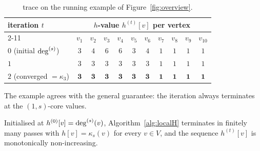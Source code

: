 \begin{table}[t]
\centering
\caption{\spin{} trace on the running example of Figure~\ref{fig:overview}.}
\label{tab:spinex}
\tiny
\setlength{\tabcolsep}{4pt}
\begin{tabular}{l|cccccccccc}
\toprule
\multirow{2}{*}{iteration $t$} & \multicolumn{10}{c}{$h$-value $h^{(t)}[v]$ per vertex} \\
\cmidrule(lr){2-11}
                                 & $v_1$ & $v_2$ & $v_3$ & $v_4$ & $v_5$ & $v_6$ & $v_7$ & $v_8$ & $v_9$ & $v_{10}$ \\
\midrule
$0$ (initial $\deg^{(s)}$)            & $3$ & $4$ & $6$ & $6$ & $3$ & $4$ & $1$ & $1$ & $1$ & $1$ \\
$1$                              & $3$ & $3$ & $3$ & $3$ & $3$ & $3$ & $1$ & $1$ & $1$ & $1$ \\
$2$ (converged $=\kappa_3$)    & $\mathbf{3}$ & $\mathbf{3}$ & $\mathbf{3}$ & $\mathbf{3}$ & $\mathbf{3}$ & $\mathbf{3}$ & $\mathbf{1}$ & $\mathbf{1}$ & $\mathbf{1}$ & $\mathbf{1}$ \\
\bottomrule
\end{tabular}
\end{table}

The example agrees with the general guarantee: the iteration always terminates at the $(1,s)$-core values.

\begin{lemma}\label{lem:hindex-convergence}
Initialised at $h^{(0)}[v]=\deg^{(s)}(v)$, Algorithm~\ref{alg:localH} terminates in finitely many passes with $h[v]=\kappa_s(v)$ for every $v\in V$, and the sequence $h^{(t)}[v]$ is monotonically non-increasing.
\end{lemma}

